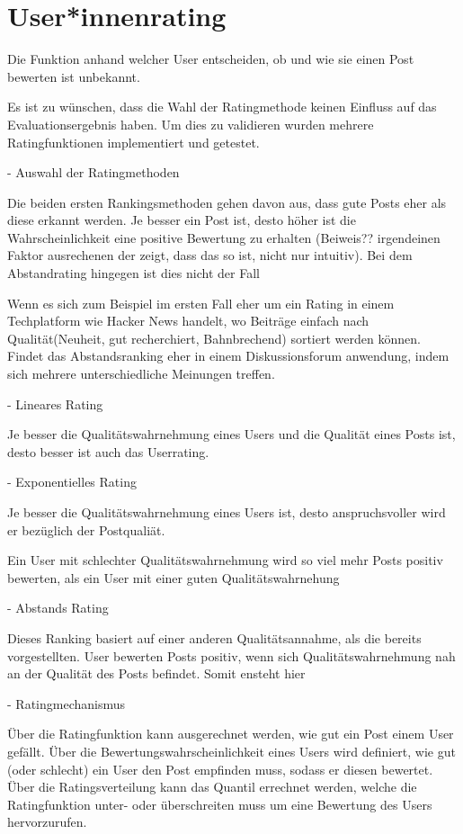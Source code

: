 \chapter{User*innenrating}


Die Funktion anhand welcher User entscheiden, ob und wie sie einen Post bewerten ist unbekannt. 

Es ist zu wünschen, dass die Wahl der Ratingmethode keinen Einfluss auf das Evaluationsergebnis haben.
Um dies zu validieren wurden mehrere Ratingfunktionen implementiert und getestet.

 


- Auswahl der Ratingmethoden


Die beiden ersten Rankingsmethoden gehen davon aus, dass gute Posts eher als diese erkannt werden. Je besser ein Post ist, desto höher ist die Wahrscheinlichkeit eine positive Bewertung zu erhalten (Beiweis?? irgendeinen Faktor ausrechenen der zeigt, dass das so ist, nicht nur intuitiv). Bei dem Abstandrating hingegen ist dies nicht der Fall

Wenn es sich zum Beispiel im ersten Fall eher um ein Rating in einem Techplatform wie Hacker News handelt, wo Beiträge einfach nach Qualität(Neuheit, gut recherchiert, Bahnbrechend) sortiert werden können.  Findet das Abstandsranking eher in einem Diskussionsforum anwendung, indem sich mehrere unterschiedliche Meinungen treffen.


- Lineares Rating

Je besser die Qualitätswahrnehmung eines Users und die Qualität eines Posts ist, desto besser ist auch das Userrating.


- Exponentielles Rating

Je besser die Qualitätswahrnehmung eines Users ist, desto anspruchsvoller wird er bezüglich der Postqualiät.

Ein User mit schlechter Qualitätswahrnehmung wird so viel mehr Posts  positiv bewerten, als ein User mit einer guten Qualitätswahrnehung



- Abstands Rating

Dieses Ranking basiert auf einer anderen Qualitätsannahme, als die bereits vorgestellten. User bewerten Posts positiv, wenn sich Qualitätswahrnehmung nah an der Qualität des Posts befindet. Somit ensteht hier 


- Ratingmechanismus


Über die Ratingfunktion kann ausgerechnet werden, wie gut ein Post einem User gefällt. Über die Bewertungswahrscheinlichkeit eines Users wird definiert, wie gut (oder schlecht) ein User den Post empfinden muss, sodass er diesen bewertet.  Über die Ratingsverteilung kann das Quantil errechnet werden, welche die Ratingfunktion unter- oder überschreiten muss um eine Bewertung des Users hervorzurufen.